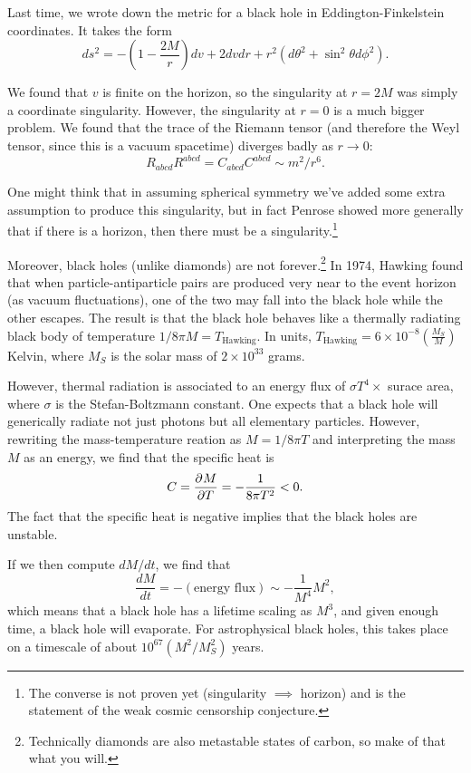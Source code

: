 Last time, we wrote down the metric for a black hole in Eddington-Finkelstein coordinates. It takes the form
$$ds^2=-\left(1-\frac{2M}{r}\right) dv+2dvdr+r^2 (d\theta^2+\sin^2 \theta d\phi^2).$$

We found that $v$ is finite on the horizon, so the singularity at $r=2M$ was simply a coordinate singularity. However, the singularity at $r=0$ is a much bigger problem. We found that the trace of the Riemann tensor (and therefore the Weyl tensor, since this is a vacuum spacetime) diverges badly as $r\to 0$:
$$R_{abcd}R^{abcd}=C_{abcd}C^{abcd}\sim m^2/r^6.$$

One might think that in assuming spherical symmetry we've added some extra assumption to produce this singularity, but in fact Penrose showed more generally that if there is a horizon, then there must be a singularity.\footnote{The converse is not proven yet (singularity $\implies$ horizon) and is the statement of the weak cosmic censorship conjecture.}

Moreover, black holes (unlike diamonds) are not forever.\footnote{Technically diamonds are also metastable states of carbon, so make of that what you will.} In 1974, Hawking found that when particle-antiparticle pairs are produced very near to the event horizon (as vacuum fluctuations), one of the two may fall into the black hole while the other escapes. The result is that the black hole behaves like a thermally radiating black body of temperature $1/8\pi M=T_{\text{Hawking}}$. In units, $T_{\text{Hawking}}=6\times 10^{-8}\left(\frac{M_S}{M}\right)$ Kelvin, where $M_S$ is the solar mass of $2\times 10^{33}$ grams.

However, thermal radiation is associated to an energy flux of $\sigma T^4\times$ surace area, where $\sigma$ is the Stefan-Boltzmann constant. One expects that a black hole will generically radiate not just photons but all elementary particles. However, rewriting the mass-temperature reation as $M=1/8\pi T$ and interpreting the mass $M$ as an energy, we find that the specific heat is
$$C=\P{M}{T}=-\frac{1}{8\pi T^2}<0.$$
The fact that the specific heat is negative implies that the black holes are unstable.

If we then compute $dM/dt$, we find that
$$\frac{dM}{dt}=-(\text{energy flux})\sim -\frac{1}{M^4}M^2,$$
which means that a black hole has a lifetime scaling as $M^3$, and given enough time, a black hole will evaporate. For astrophysical black holes, this takes place on a timescale of about $10^{67}(M^2/M_S^2)$ years.

